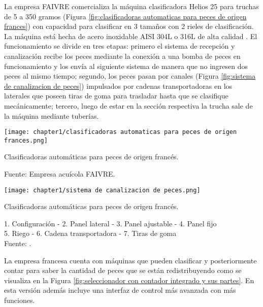 La empresa FAIVRE comercializa la máquina clasificadora Helios 25 para truchas de 5 a 350 gramos (Figura \ref{fig:clasificadoras automaticas para peces de origen frances}) con capacidad para clasificar en 3 tamaños con 2 rieles de clasificación. La máquina está hecha de acero inoxidable AISI 304L o 316L de alta calidad \citep[p.~1]{FAIVRE2019a}. El funcionamiento se divide en tres etapas: primero el sistema de recepción y canalización recibe los peces mediante la conexión a una bomba de peces en funcionamiento y los envía al siguiente sistema de manera que no ingresen dos peces al mismo tiempo; segundo, los peces pasan por canales (Figura \ref{fig:sistema de canalizacion de peces}) impulsados por cadenas transportadoras en los laterales que poseen tiras de goma para trasladar hasta que se clasifique mecánicamente; tercero, luego de estar en la sección respectiva la trucha sale de la máquina mediante tuberías.

\begin{myfigure}[H]
	\footnotesize\centering
	\texttt{[image: chapter1/clasificadoras automaticas para peces de origen frances.png]}
	\caption{Clasificadoras automáticas para peces de origen francés.}
	\begin{myflushcenter}		
		Fuente: Empresa acuícola FAIVRE.
	\end{myflushcenter}
	\label{fig:clasificadoras automaticas para peces de origen frances}
\end{myfigure}

\begin{myfigure}[H]
	\footnotesize\centering
	\texttt{[image: chapter1/sistema de canalizacion de peces.png]}
	\caption{Clasificadoras automáticas para peces de origen francés.}
	\begin{myflushcenter}		
		1. Configuración - 2. Panel lateral - 3. Panel ajustable - 4. Panel fijo \\
		5. Riego - 6. Cadena transportadora - 7. Tiras de goma\\
		Fuente: \citep{FAIVRE2018}.
	\end{myflushcenter}	
	\label{fig:sistema de canalizacion de peces}
\end{myfigure}

La empresa francesa cuenta con máquinas que pueden clasificar y posteriormente contar para saber la cantidad de peces que se están redistribuyendo como se visualiza en la Figura \ref{fig:seleccionador con contador integrado y sus partes}. En esta versión además incluye una interfaz de control más avanzada con más funciones.

